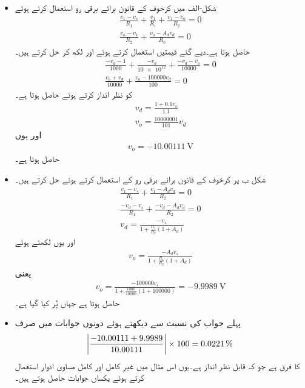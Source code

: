 \begin{itemize}
\item
شکل-الف میں کرخوف کے قانون برائے برقی رو استعمال کرتے ہوئے
\begin{align*}
\frac{v_1-v_s}{R_1}+\frac{v_1}{R_i}+\frac{v_1-v_o}{R_2}=0\\
\frac{v_o-v_1}{R_2}+\frac{v_o-A_d v_d}{R_o}=0
\end{align*}
حاصل ہوتا ہے۔دیے گئے قیمتیں استعمال کرتے ہوئے اور  لکھ کر حل کرتے ہیں۔
\begin{align*}
\frac{-v_d-1}{\num{1000}}+\frac{-v_d}{\num{10e12}}+\frac{-v_d-v_o}{\num{10000}}=0\\
\frac{v_o+v_d}{\num{10000}}+\frac{v_o-\num{100000} v_d}{\num{100}}=0
\end{align*}
 کو نظر انداز کرتے ہوئے  حاصل ہوتا ہے۔
\begin{align*}
v_d=\frac{1+0.1 v_o}{1.1}\\
v_o=\frac{\num{10000001}}{101} v_d
\end{align*}
 اور یوں
\begin{align*}
v_o=\SI{-10.00111}{\volt}
\end{align*}
حاصل ہوتا ہے۔
\item
شکل  ب پر کرخوف کے قانون برائے برقی رو کے استعمال کرتے ہوئے حل کرتے ہیں۔
\begin{align*}
\frac{v_1-v_s}{R_1}+\frac{v_1-A_d v_d}{R_2}=0\\
\frac{-v_d-v_s}{R_1}+\frac{-v_d-A_d v_d}{R_2}=0\\
v_d=\frac{-v_s}{1+\frac{R_1}{R_2}\left(1+A_d \right)}
\end{align*}
اور یوں  لکھتے ہوئے
\begin{align} \label{مساوات_حسابی_کامل_مثال_حل}
v_o=\frac{-A_d v_s}{1+\frac{R_1}{R_2}\left(1+A_d \right)}
\end{align}
یعنی
\begin{align*}
v_o=\frac{-\num{100000} v_s}{1+\frac{\num{1000}}{\num{10000}}\left(1+\num{100000} \right)}=\SI{-9.9989}{\volt}
\end{align*}
حاصل ہوتا ہے جہاں  پُر کیا گیا ہے۔
\item
پہلے جواب کی نسبت سے دیکھتے ہوئے دونوں جوابات میں صرف
\begin{align*}
\abs{\frac{-10.00111+9.9989}{10.00111}} \times 100=\SI{0.0221}{\percent}
\end{align*}
کا فرق ہے جو کہ قابل نظر انداز ہے۔یوں اس مثال میں غیر کامل اور کامل مساوی ادوار استعمال کرتے ہوئے یکساں جوابات حاصل ہوتے ہیں۔
\end{itemize}

